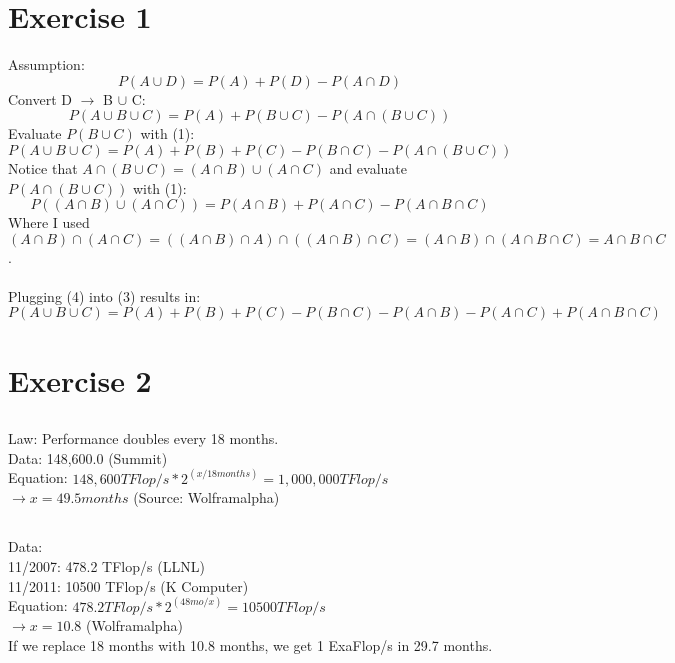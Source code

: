 \documentclass[12pt]{article}
\begin{document}
\section{Exercise 1}
Assumption:
\begin{equation}
P ( A \cup D ) = P ( A ) + P ( D ) - P ( A \cap D )
\end{equation}
Convert D $\rightarrow$ B $\cup$ C:
\begin{equation}
P ( A \cup B \cup C ) = P ( A ) + P ( B \cup C ) - P ( A \cap (B \cup C) )
\end{equation}
Evaluate $P(B\cup C)$ with (1):
\begin{equation}
P ( A \cup B \cup C ) = P ( A ) + P(B) + P(C) - P(B \cap C) - P ( A \cap (B \cup C) )
\end{equation}
Notice that $A \cap (B \cup C) = (A \cap B) \cup (A \cap C)$ and evaluate $P ( A \cap (B \cup C) )$ with (1):
\begin{equation}
P (  (A \cap B) \cup (A \cap C)) =  P(A \cap B) + P(A\cap C) - P(A \cap B \cap C)
\end{equation}
Where I used $(A \cap B) \cap (A \cap C) = ((A \cap B) \cap A) \cap ( (A \cap B) \cap C) = (A \cap B) \cap (A \cap B \cap C) =  A \cap B \cap C$. \\\\
Plugging (4) into (3) results in:
\begin{equation}
P ( A \cup B \cup C ) = P ( A ) + P(B) + P(C) - P(B \cap C) - P(A \cap B) - P(A\cap C) + P(A \cap B \cap C)
\end{equation}
\section{Exercise 2}
\subsection{}
Law: Performance doubles every 18 months. \\
Data: 148,600.0 (Summit) \\
Equation: $148,600 TFlop/s * 2^{(x/18 months)} = 1,000,000 TFlop/s$ \\
$ \rightarrow x = 49.5 months $ (Source: Wolframalpha)
\subsection{}
Data: \\
11/2007: 478.2 TFlop/s (LLNL)\\ 11/2011: 10500 TFlop/s (K Computer) \\
Equation: $478.2 TFlop/s * 2^{(48mo/x)} =  10500 TFlop/s$ \\
$ \rightarrow x = 10.8$ (Wolframalpha)
\\ If we replace 18 months with 10.8 months, we get 1 ExaFlop/s in 29.7 months.
\end{document}
